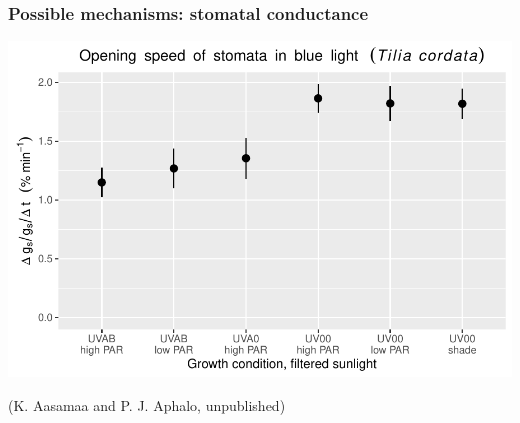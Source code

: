 \documentclass[10pt]{beamer}\usepackage[]{graphicx}\usepackage[]{color}
\newenvironment{knitrout}{}{} %
\begin{document}
%

\begin{frame}[fragile]
  \frametitle{Possible mechanisms: stomatal conductance}
\begin{knitrout}\scriptsize
{}\color{fgcolor}

{\centering \includegraphics[width=.8\textwidth]{figure/pos-unnamed-chunk-1-1} 

}



\end{knitrout}

(K. Aasamaa and P. J. Aphalo, unpublished)
\end{frame}

%
\end{document}
